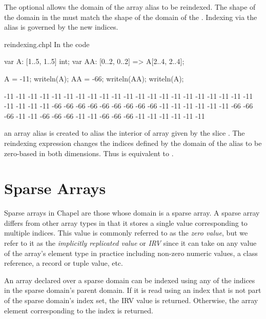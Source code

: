 The optional  allows the domain of the
array alias to be reindexed.  The shape of the domain in
the  must match the shape of the domain of
the .  Indexing via the alias is governed by
the new indices.

\begin{chapelexample}{reindexing.chpl}
In the code
\begin{chapel}
var A: [1..5, 1..5] int;
var AA: [0..2, 0..2] => A[2..4, 2..4];
\end{chapel}
\begin{chapelpost}
A = -11;
writeln(A);
AA = -66;
writeln(AA);
writeln(A);
\end{chapelpost}
\begin{chapeloutput}
-11 -11 -11 -11 -11
-11 -11 -11 -11 -11
-11 -11 -11 -11 -11
-11 -11 -11 -11 -11
-11 -11 -11 -11 -11
-66 -66 -66
-66 -66 -66
-66 -66 -66
-11 -11 -11 -11 -11
-11 -66 -66 -66 -11
-11 -66 -66 -66 -11
-11 -66 -66 -66 -11
-11 -11 -11 -11 -11
\end{chapeloutput}
an array alias  is created to alias the interior of
array  given by the slice .  The
reindexing expression changes the indices defined by the domain of the
alias to be zero-based in both dimensions.  Thus  is
equivalent to .
\end{chapelexample}

%
%


\section{Sparse Arrays}
\label{Sparse_Arrays}

Sparse arrays in Chapel are those whose domain is a sparse array.  A
sparse array differs from other array types in that it stores a single
value corresponding to multiple indices.  This value is commonly
referred to as the \emph{zero value}, but we refer to it as the
\emph{implicitly replicated value} or \emph{IRV} since it can take
on any value of the array's element type in practice including
non-zero numeric values, a class reference, a record or tuple value,
etc.

An array declared over a sparse domain can be indexed using any of the
indices in the sparse domain's parent domain.  If it is read using an
index that is not part of the sparse domain's index set, the IRV value
is returned.  Otherwise, the array element corresponding to the index
is returned.

